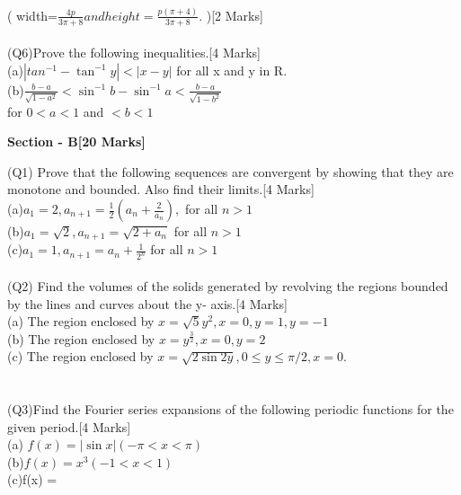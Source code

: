 \documentclass[12pt]{article}
\begin{document}
{\\( width=$ \frac{4p} {3\pi +8} and height = \frac{p(\pi +4)}{3\pi +8}$. )\hspace*{6.1cm}[2 Marks]
\\\\(Q6)Prove the following inequalities.\hspace*{6cm}[4 Marks]
\\(a)$|tan ^{-1}- \tan ^{-1}y|<|x-y|$ for all x and y in R.
\\(b)$\frac{b-a}{\sqrt{1-a^2}}< \sin ^{-1}b -\sin ^{-1}a <\frac{b-a}{\sqrt{1-b^2}} $ \\ \hspace*{0.6cm} for $0<a<1$  and  $<b<1$

\newpage
\begin{center}
\textbf{Section - B\hspace*{8cm}[20 Marks]}
\end{center}
(Q1) Prove that the following sequences are convergent by showing that they are monotone and bounded. Also find their limits.\hspace*{3cm}[4 Marks]\\
(a)$a_{1}=2,a_{n+1} = \frac{1}{2}(a_{n} + \frac{2}{a_{n}}),$ for all $n>1$ \\
(b)$a_{1}=\sqrt{2} ,a_{n+1}=\sqrt{2+a_{n}}$ for all $n>1$  \\
\hspace*{0.6cm} (c)$a_{1}=1 ,a_{n+1}=a_{n} + \frac{1}{2^{n}}$ for all $n>1$
\\\\(Q2) Find the volumes of the solids generated by revolving the regions bounded by the lines and curves about the y- axis.\hspace*{3cm}[4 Marks]\\
(a) The region enclosed by $x = \sqrt{5}y^2 , x = 0, y=1,y= -1$\\
(b) The region enclosed by $x = y^\frac{3}{2} , x=0 , y= 2$\\
(c) The region enclosed by $ x = \sqrt{2\sin 2y}, 0 \leq y \leq \pi/2 , x=0.$\\\\\\
(Q3)Find the Fourier series expansions of the following periodic functions for the given period.\hspace*{9cm}[4 Marks]\\
(a) $f(x) = |\sin x| ({-\pi}< x < \pi)$\\
(b)$ f(x) = x^3 ({-1} < x < 1)$\\
(c)f(x) = \begin{math}

\end{math}}
\end{document}
